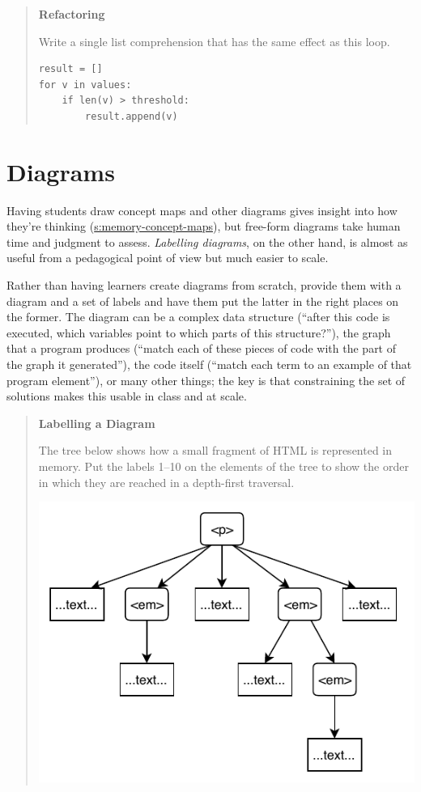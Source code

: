 \begin{quote}\setlength{\parindent}{0pt}
\textbf{Refactoring}

Write a single list comprehension that has the same effect as this
loop.

\begin{lstlisting}
result = []
for v in values:
    if len(v) > threshold:
        result.append(v)
\end{lstlisting}
\end{quote}

\section{Diagrams}\label{s:exercises-diagrams}

Having students draw concept maps and other diagrams gives insight into
how they're thinking (\protect\hyperlink{SECTION}{s:memory-concept-maps}), but free-form
diagrams take human time and judgment to assess. \emph{Labelling diagrams},
on the other hand, is almost as useful from a pedagogical point of view
but much easier to scale.

Rather than having learners create diagrams from scratch, provide them
with a diagram and a set of labels and have them put the latter in the
right places on the former. The diagram can be a complex data structure
(``after this code is executed, which variables point to which parts of
this structure?''), the graph that a program produces (``match each of
these pieces of code with the part of the graph it generated''), the code
itself (``match each term to an example of that program element''), or
many other things; the key is that constraining the set of solutions
makes this usable in class and at scale.

\begin{quote}\setlength{\parindent}{0pt}
\textbf{Labelling a Diagram}

The tree below shows how a small fragment of HTML is represented in
memory. Put the labels 1--10 on the elements of the tree to show the
order in which they are reached in a depth-first traversal.

\includegraphics{../../files/labelling.pdf}
\end{quote}

